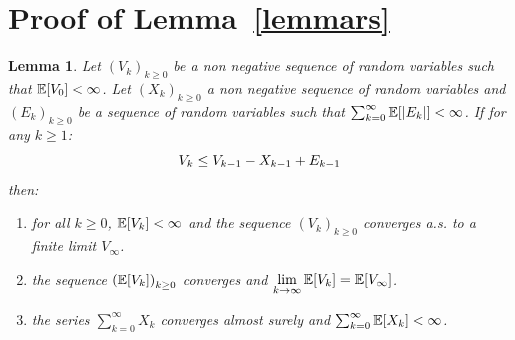 \documentclass[11pt]{article}
\newtheorem*{Lemma*}{Lemma}
\theoremstyle{t}
\begin{document}
 \section{Proof of Lemma~\ref{lemmars}}\label{appendix:lemma}
\begin{Lemma*}
Let $\left(V_k \right)_{k\geq0}$ be a non negative sequence of random variables such that $\EE[V_0] < \infty$. Let $\left(X_k \right)_{k\geq0}$ a non negative sequence of random variables and $\left(E_k \right)_{k \geq 0}$ be a sequence of random variables such that $\sum_{k=0}^{\infty}{\EE[|E_k|]} < \infty$. If for any $k \geq 1$:
\begin{equation}\notag
V_{k} \leq V_{k-1} - X_{k-1} + E_{k-1}
\end{equation}
 then:
\begin{enumerate}[label=(\roman*)]
\item for all $k \geq 0$, $\EE[V_k] < \infty$ and the sequence $\left(V_k \right)_{k\geq0}$  converges a.s. to a finite limit $V_{\infty}$.
\item the sequence $\left(\EE[V_k] \right)_{k\geq0}$ converges and $\lim \limits_{k \to \infty}\EE[V_k] = \EE[V_{\infty}] $.
\item the series $\sum_{k=0}^{\infty}{X_k}$ converges almost surely and $\sum_{k=0}^{\infty}{\EE[X_k]}< \infty$.
\end{enumerate}
\end{Lemma*}
\end{document}
